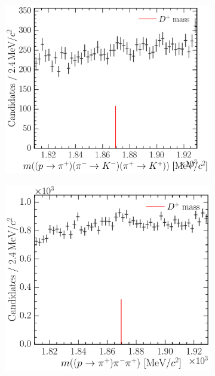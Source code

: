 \begin{figure}
\begin{subfigure}[b]{0.3\textwidth}
    \caption{\decay{\PDplus}{\Ppiplus\PKminus\Ppiplus}}
    \label{fig:cpv:selection:background_study:ppipi_meson:dplus_pikpi}
  \end{subfigure}
  \begin{subfigure}[b]{0.3\textwidth}
    \includegraphics[width=\textwidth]{figures/cpv/selection/background_study/ppipi/LcToppipi_2012_MagDown_Dp_ppTopip_pimTokm_pipTokp}
    \caption{\decay{\PDplus}{\Ppiplus\PKminus\PKplus}}
    \label{fig:cpv:selection:background_study:ppipi_meson:dplus_pikk}
  \end{subfigure}
  \begin{subfigure}[b]{0.3\textwidth}
    \includegraphics[width=\textwidth]{figures/cpv/selection/background_study/ppipi/LcToppipi_2012_MagDown_Dp_ppTopip_pim_pip}

\end{subfigure}
\end{figure}
